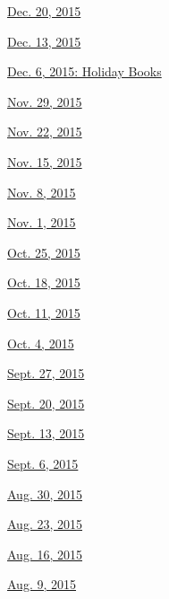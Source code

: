 \href{http://www.nytimes.com/indexes/2015/12/20/todayspaper/index.html\#bookreview}{Dec.
20, 2015}

\href{http://www.nytimes.com/indexes/2015/12/13/todayspaper/index.html\#bookreview}{Dec.
13, 2015}

\href{http://www.nytimes.com/indexes/2015/12/06/books/review/index.html}{Dec.
6, 2015: Holiday Books}

\href{http://www.nytimes.com/indexes/2015/11/29/books/review/index.html}{Nov.
29, 2015}

\href{http://www.nytimes.com/indexes/2015/11/22/books/review/index.html}{Nov.
22, 2015}

\href{http://www.nytimes.com/indexes/2015/11/15/books/review/index.html}{Nov.
15, 2015}

\href{http://www.nytimes.com/indexes/2015/11/08/books/review/index.html}{Nov.
8, 2015}

\href{http://www.nytimes.com/indexes/2015/11/01/books/review/index.html}{Nov.
1, 2015}

\href{http://www.nytimes.com/indexes/2015/10/25/books/review/index.html}{Oct.
25, 2015}

\href{http://www.nytimes.com/indexes/2015/10/18/books/review/index.html}{Oct.
18, 2015}

\href{http://www.nytimes.com/indexes/2015/10/11/books/review/index.html}{Oct.
11, 2015}

\href{http://www.nytimes.com/indexes/2015/10/04/books/review/index.html}{Oct.
4, 2015}

\href{http://www.nytimes.com/indexes/2015/09/27/books/review/index.html}{Sept.
27, 2015}

\href{http://www.nytimes.com/indexes/2015/09/20/books/review/index.html}{Sept.
20, 2015}

\href{http://www.nytimes.com/indexes/2015/09/13/books/review/index.html}{Sept.
13, 2015}

\href{http://www.nytimes.com/indexes/2015/09/06/books/review/index.html}{Sept.
6, 2015}

\href{http://www.nytimes.com/indexes/2015/08/30/books/review/index.html}{Aug.
30, 2015}

\href{http://www.nytimes.com/indexes/2015/08/23/books/review/index.html}{Aug.
23, 2015}

\href{http://www.nytimes.com/indexes/2015/08/16/books/review/index.html}{Aug.
16, 2015}

\href{http://www.nytimes.com/indexes/2015/08/09/books/review/index.html}{Aug.
9, 2015}

